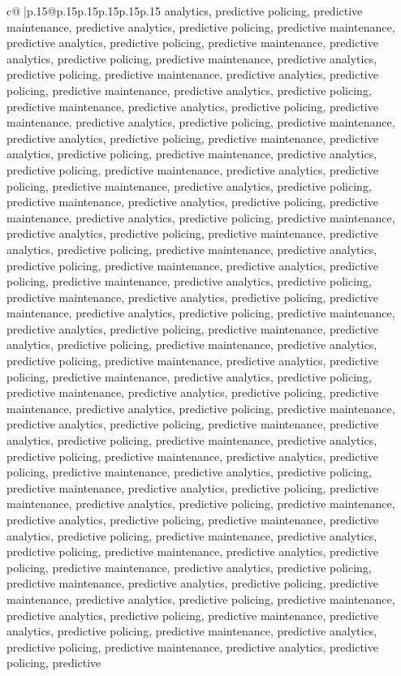 \documentclass{article}
\begin{document}
{\begin{supertabular}{c@{$\;$}|p{.15\linewidth}@{}p{.15\linewidth}p{.15\linewidth}p{.15\linewidth}p{.15\linewidth}p{.15\linewidth}}
{{{analytics, predictive policing, predictive maintenance, predictive analytics, predictive policing, predictive maintenance, predictive analytics, predictive policing, predictive maintenance, predictive analytics, predictive policing, predictive maintenance, predictive analytics, predictive policing, predictive maintenance, predictive analytics, predictive policing, predictive maintenance, predictive analytics, predictive policing, predictive maintenance, predictive analytics, predictive policing, predictive maintenance, predictive analytics, predictive policing, predictive maintenance, predictive analytics, predictive policing, predictive maintenance, predictive analytics, predictive policing, predictive maintenance, predictive analytics, predictive policing, predictive maintenance, predictive analytics, predictive policing, predictive maintenance, predictive analytics, predictive policing, predictive maintenance, predictive analytics, predictive policing, predictive maintenance, predictive analytics, predictive policing, predictive maintenance, predictive analytics, predictive policing, predictive maintenance, predictive analytics, predictive policing, predictive maintenance, predictive analytics, predictive policing, predictive maintenance, predictive analytics, predictive policing, predictive maintenance, predictive analytics, predictive policing, predictive maintenance, predictive analytics, predictive policing, predictive maintenance, predictive analytics, predictive policing, predictive maintenance, predictive analytics, predictive policing, predictive maintenance, predictive analytics, predictive policing, predictive maintenance, predictive analytics, predictive policing, predictive maintenance, predictive analytics, predictive policing, predictive maintenance, predictive analytics, predictive policing, predictive maintenance, predictive analytics, predictive policing, predictive maintenance, predictive analytics, predictive policing, predictive maintenance, predictive analytics, predictive policing, predictive maintenance, predictive analytics, predictive policing, predictive maintenance, predictive analytics, predictive policing, predictive maintenance, predictive analytics, predictive policing, predictive maintenance, predictive analytics, predictive policing, predictive maintenance, predictive analytics, predictive policing, predictive maintenance, predictive analytics, predictive policing, predictive maintenance, predictive analytics, predictive policing, predictive maintenance, predictive analytics, predictive policing, predictive maintenance, predictive analytics, predictive policing, predictive maintenance, predictive analytics, predictive policing, predictive maintenance, predictive analytics, predictive policing, predictive maintenance, predictive analytics, predictive policing, predictive maintenance, predictive analytics, predictive policing, predictive maintenance, predictive analytics, predictive policing, predictive maintenance, predictive analytics, predictive policing, predictive maintenance, predictive analytics, predictive policing, predictive maintenance, predictive analytics, predictive policing, predictive }}}
\end{supertabular}}
\end{document}
